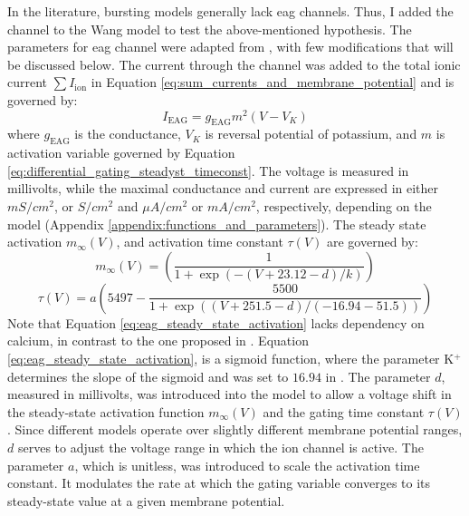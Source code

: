 \documentclass[../main.tex]{subfiles}
\begin{document}
In the literature, bursting models generally lack \gls{eag} channels. Thus, I added the channel to the Wang model to test the above-mentioned hypothesis. The parameters for \gls{eag} channel were adapted from \parencite{bronkRegulationEagCa22018}, with few modifications that will be discussed below. The current through the channel was added to the total ionic current $\sum I_{\text{ion}}$ in Equation \ref{eq:sum_currents_and_membrane_potential} and is governed by:
\begin{equation}\label{eq:current_eag}
    I_{\text{EAG}} = g_{\text{EAG}} m^2 (V - V_K)
\end{equation}
where $g_{\text{EAG}}$ is the conductance, $V_K$ is reversal potential of potassium, and $m$ is activation variable governed by Equation \ref{eq:differential_gating_steadyst_timeconst}. The voltage is measured in millivolts, while the maximal conductance and current are expressed in either $mS/cm^2$, or $S/cm^2$ and $\mu A/cm^2$ or $mA/cm^2$, respectively, depending on the model (Appendix \ref{appendix:functions_and_parameters}). The steady state activation $m_{\infty}(V)$, and activation time constant $\tau(V)$ are governed by:
\begin{equation}\label{eq:eag_steady_state_activation}
    m_\infty(V) = \left( \frac{1}{1 + \exp{(-(V+23.12-d)/k)}} \right)
\end{equation}
\begin{equation} \label{eq:eag_tau_activation}
    \tau(V) = a\left(5497 - \frac{5500}{1 + \exp( (V + 251.5 - d) / (-16.94-51.5) ) }\right)
\end{equation}
Note that Equation \ref{eq:eag_steady_state_activation} lacks dependency on calcium, in contrast to the one proposed in \parencite{bronkRegulationEagCa22018}. Equation \ref{eq:eag_steady_state_activation}, is a sigmoid function, where the parameter K$^+$ determines the slope of the sigmoid and was set to $16.94$ in \parencite{bronkRegulationEagCa22018}. 
The parameter $d$, measured in millivolts, was introduced into the model to allow a voltage shift in the steady-state activation function  $m_\infty(V)$ and the gating time constant $\tau(V)$. Since different models operate over slightly different membrane potential ranges, $d$ serves to adjust the voltage range in which the ion channel is active.
The parameter $a$, which is unitless, was introduced to scale the activation time constant. It modulates the rate at which the gating variable converges to its steady-state value at a given membrane potential.
\end{document}
